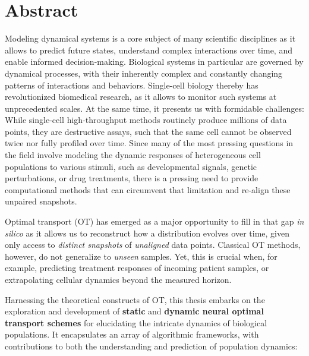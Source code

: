 \begingroup
\let\clearpage\relax
\let\cleardoublepage\relax
\let\cleardoublepage\relax

\chapter*{Abstract}

Modeling dynamical systems is a core subject of many scientific disciplines as it allows to predict future states, understand complex interactions over time, and enable informed decision-making.
Biological systems in particular are governed by dynamical processes, with their inherently complex and constantly changing patterns of interactions and behaviors.
Single-cell biology thereby has revolutionized biomedical research, as it allows to monitor such systems at unprecedented scales.
At the same time, it presents us with formidable challenges: While single-cell high-throughput methods routinely produce millions of data points, they are destructive assays, such that the same cell cannot be observed twice nor fully profiled over time.
Since many of the most pressing questions in the field involve modeling the dynamic responses of heterogeneous cell populations to various stimuli, such as developmental signals, genetic perturbations, or drug treatments, there is a pressing need to provide computational methods that can circumvent that limitation and re-align these unpaired snapshots.

Optimal transport (OT) has emerged as a major opportunity to fill in that gap \textit{in silico} as it allows us to reconstruct how a distribution evolves over time, given only access to \emph{distinct snapshots} of \emph{unaligned} data points.
Classical OT methods, however, do not generalize to \emph{unseen} samples. Yet, this is crucial when, for example, predicting treatment responses of incoming patient samples, or extrapolating cellular dynamics beyond the measured horizon.

Harnessing the theoretical constructs of OT, this thesis embarks on the exploration and development of \textbf{static} and \textbf{dynamic neural optimal transport schemes} for elucidating the intricate dynamics of biological populations. It encapsulates an array of algorithmic frameworks, with contributions to both the understanding and prediction of population dynamics:

